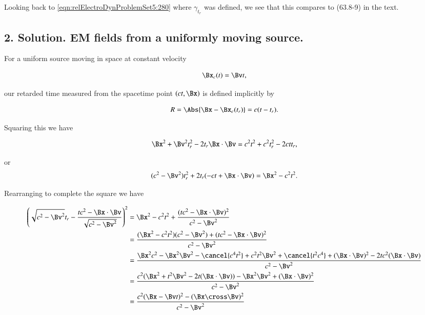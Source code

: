 Looking back to \ref{eqn:relElectroDynProblemSet5:280} where $\gamma_{t_r}$ was defined, we see that this compares to (63.8-9) in the text.

\subsection{2. Solution.  EM fields from a uniformly moving source.}

For a uniform source moving in space at constant velocity

\begin{equation}\label{eqn:relElectroDynProblemSet5:590}
\Bx_c(t) = \Bv t,
\end{equation}

our retarded time measured from the spacetime point $(ct, \Bx)$ is defined implicitly by

\begin{equation}\label{eqn:relElectroDynProblemSet5:610}
R = \Abs{\Bx - \Bx_c(t_r) } = c (t - t_r).
\end{equation}

Squaring this we have

\begin{equation}\label{eqn:relElectroDynProblemSet5:630}
\Bx^2 + \Bv^2 t_r^2 - 2 t_r \Bx \cdot \Bv = c^2 t^2 + c^2 t_r^2 - 2 c t t_r,
\end{equation}

or
\begin{equation}\label{eqn:relElectroDynProblemSet5:650}
( c^2 -\Bv^2) t_r^2 + 2 t_r ( - c t + \Bx \cdot \Bv ) = \Bx^2 - c^2 t^2.
\end{equation}

Rearranging to complete the square we have

\begin{align*}
\left( \sqrt{c^2 - \Bv^2} t_r - \frac{ t c^2 - \Bx \cdot \Bv }{\sqrt{c^2 - \Bv^2}} \right)^2 
&= \Bx^2 - c^2 t^2 +\frac{ (t c^2 - \Bx \cdot \Bv)^2 }{c^2 - \Bv^2} \\
&= \frac{ (\Bx^2 - c^2 t^2)( c^2 - \Bv^2) + (t c^2 - \Bx \cdot \Bv)^2}{ c^2 - \Bv^2} \\
&= \frac{ \Bx^2 c^2 - \Bx^2 \Bv^2 - \cancel{c^4 t^2} + c^2 t^2 \Bv^2 + \cancel{t^2 c^4} + (\Bx \cdot \Bv)^2 - 2 t c^2 (\Bx \cdot \Bv) }{ c^2 - \Bv^2 } \\
&= \frac{ c^2 ( \Bx^2 + t^2 \Bv^2 -2 t (\Bx \cdot \Bv)) - \Bx^2 \Bv^2 + (\Bx \cdot \Bv)^2 }{ c^2 - \Bv^2 } \\
&= \frac{ c^2 ( \Bx - \Bv t)^2 - (\Bx \cross \Bv)^2 }{ c^2 - \Bv^2 } \\
\end{align*}

